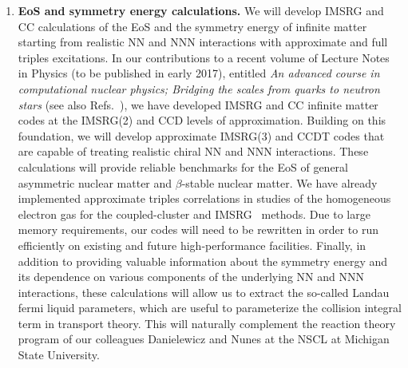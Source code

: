 \begin{enumerate}
\item{\bf EoS and symmetry energy calculations.} We will develop IMSRG and CC calculations of
  the EoS and the symmetry energy of infinite matter starting from
  realistic NN and NNN interactions with approximate and full triples excitations. In our contributions to a recent
  volume of Lecture Notes in Physics (to be published in early
  2017), entitled {\em An advanced course in computational nuclear
   physics; Bridging the scales from quarks to neutron stars}
  \cite{lnp} (see also Refs.~\cite{Baardsen:2013vwa,Hagen:2013yba}), we have
  developed IMSRG and CC infinite matter codes at the IMSRG(2) and CCD levels of approximation. Building on this foundation,
  we will develop approximate IMSRG(3) and CCDT codes that are capable of treating realistic chiral NN and NNN interactions. These calculations will provide reliable   benchmarks for the EoS of general asymmetric nuclear matter and
$\beta$-stable nuclear matter. We have already implemented approximate 
  triples correlations in studies of the homogeneous electron gas for the coupled-cluster
  \cite{audunthesis} and IMSRG~\cite{TitusThesis} methods. Due to large memory requirements, our codes will need to be rewritten in order to run efficiently on existing and
  future high-performance facilities.  Finally, in addition to providing valuable information about the symmetry
  energy and its dependence on various components
  of the underlying NN and NNN interactions, these
  calculations will allow us to extract the so-called Landau fermi
  liquid parameters, which are useful to parameterize the collision
  integral term in transport theory.  This will naturally complement
  the reaction theory program of our colleagues Danielewicz and Nunes at the
  NSCL at Michigan State University.



\end{enumerate}
